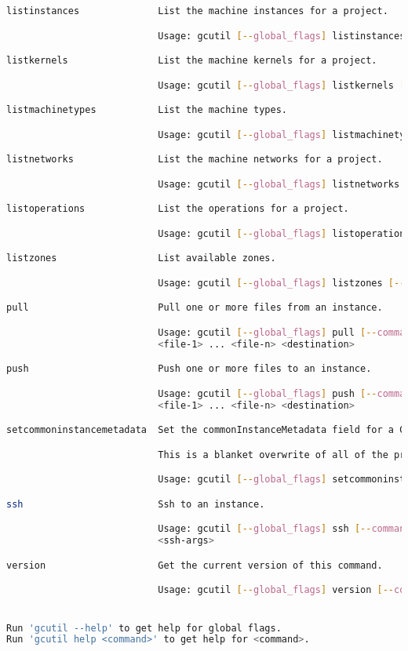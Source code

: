 \begin{lstlisting}[language=Bash]
listinstances              List the machine instances for a project.

                           Usage: gcutil [--global_flags] listinstances [--command_flags]

listkernels                List the machine kernels for a project.

                           Usage: gcutil [--global_flags] listkernels [--command_flags]

listmachinetypes           List the machine types.

                           Usage: gcutil [--global_flags] listmachinetypes [--command_flags]

listnetworks               List the machine networks for a project.

                           Usage: gcutil [--global_flags] listnetworks [--command_flags]

listoperations             List the operations for a project.

                           Usage: gcutil [--global_flags] listoperations [--command_flags]

listzones                  List available zones.

                           Usage: gcutil [--global_flags] listzones [--command_flags]

pull                       Pull one or more files from an instance.

                           Usage: gcutil [--global_flags] pull [--command_flags] <instance-name>
                           <file-1> ... <file-n> <destination>

push                       Push one or more files to an instance.

                           Usage: gcutil [--global_flags] push [--command_flags] <instance-name>
                           <file-1> ... <file-n> <destination>

setcommoninstancemetadata  Set the commonInstanceMetadata field for a Google Compute Engine project.

                           This is a blanket overwrite of all of the project wide metadata.

                           Usage: gcutil [--global_flags] setcommoninstancemetadata [--command_flags]

ssh                        Ssh to an instance.

                           Usage: gcutil [--global_flags] ssh [--command_flags] <instance-name>
                           <ssh-args>

version                    Get the current version of this command.

                           Usage: gcutil [--global_flags] version [--command_flags]


Run 'gcutil --help' to get help for global flags.
Run 'gcutil help <command>' to get help for <command>.
  \end{lstlisting}

